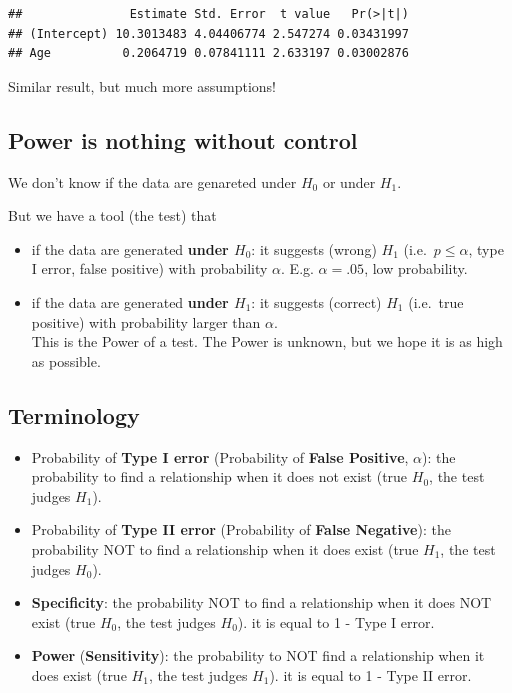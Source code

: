 \documentclass[]{article}
\providecommand{\tightlist}{%
  \setlength{\itemsep}{0pt}\setlength{\parskip}{0pt}}
\begin{document}
\begin{verbatim}
##               Estimate Std. Error  t value   Pr(>|t|)
## (Intercept) 10.3013483 4.04406774 2.547274 0.03431997
## Age          0.2064719 0.07841111 2.633197 0.03002876
\end{verbatim}

Similar result, but much more assumptions!

\hypertarget{power-is-nothing-without-control}{%
\subsection{Power is nothing without
control}\label{power-is-nothing-without-control}}

We don't know if the data are genareted under \(H_0\) or under \(H_1\).

But we have a tool (the test) that

\begin{itemize}
\tightlist
\item
  if the data are generated \textbf{under \(H_0\)}: it suggests (wrong)
  \(H_1\) (i.e.~\(p\leq \alpha\), type I error, false positive) with
  probability \(\alpha\). E.g. \(\alpha=.05\), low probability.
\item
  if the data are generated \textbf{under \(H_1\)}: it suggests
  (correct) \(H_1\) (i.e.~true positive) with probability larger than
  \(\alpha\).\\
  This is the Power of a test. The Power is unknown, but we hope it is
  as high as possible.
\end{itemize}

\hypertarget{terminology}{%
\subsection{Terminology}\label{terminology}}

\begin{itemize}
\item
  Probability of \textbf{Type I error} (Probability of \textbf{False
  Positive}, \(\alpha\)): the probability to find a relationship when it
  does not exist (true \(H_0\), the test judges \(H_1\)).
\item
  Probability of \textbf{Type II error} (Probability of \textbf{False
  Negative}): the probability NOT to find a relationship when it does
  exist (true \(H_1\), the test judges \(H_0\)).
\item
  \textbf{Specificity}: the probability NOT to find a relationship when
  it does NOT exist (true \(H_0\), the test judges \(H_0\)). it is equal
  to 1 - Type I error.
\item
  \textbf{Power} (\textbf{Sensitivity}): the probability to NOT find a
  relationship when it does exist (true \(H_1\), the test judges
  \(H_1\)). it is equal to 1 - Type II error.
\end{itemize}
\end{document}
